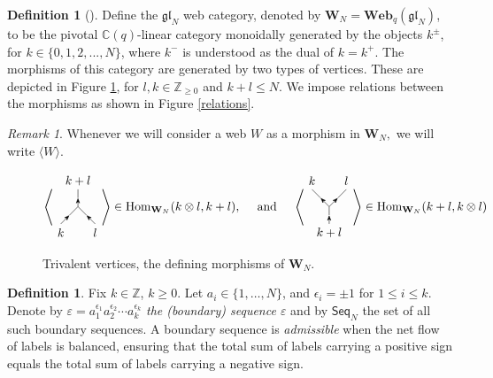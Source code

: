 \documentclass[12pt]{amsart}
\theoremstyle{definition}
\newtheorem{definition}[theorem]{Definition}
\theoremstyle{remark}
\newtheorem{remark}[theorem]{Remark}
\numberwithin{equation}{section}
\numberwithin{figure}{section}
\newcommand{\GL}{\mathfrak{gl}}
\newcommand{\Z}{\mathbb{Z}}
\newcommand{\webcat}{\mathbf{Web}}
\newcommand{\Web}{\mathbf{W}_N}
\newcommand{\Hom}{\mathrm{Hom}}
\newcommand{\Seq}{\mathsf{Seq}}
\begin{document}
\begin{definition} [{\cite[Section 2.2]{CKM2014}}] \label{TypeAWebs}
 Define the $\GL_N$ web category, denoted by 
 $\Web=\webcat_q(\GL_{N})$, to be the pivotal $\mathbb{C}(q)$-linear category monoidally generated by the objects $k^{\pm}$, for $k \in \{0,1,2,...,N\}$,
 where $k^-$ is understood as the dual of $k=k^{+}$. The morphisms of this category are generated by two types of vertices. These are depicted in Figure \ref{fig:Y}, for $l,k \in \mathbb{Z}_{\ge 0}$ and $k+l \leq N$. We impose relations between the morphisms as shown in Figure \ref{relations}.
 \end{definition}

\begin{remark}\label{rmk:web with langle in web category}
    Whenever we will consider a web $W$ as a morphism in $\Web,$ we will write $\langle W \rangle$.
\end{remark}
 
\begin{figure}[htbp]
  \centering
  \begin{equation*}
    \left\langle\begin{tikzpicture}[scale=0.5, baseline=-3]
      \draw[-Stealth] (0,0)--(0,0.5);
      \draw (0,0.5)--(0,1);
      \draw[-Stealth] (-1,-1)--(-0.5,-0.5);
      \draw (-0.5,-0.5)--(0,0);
      \draw[-Stealth] (1,-1)--(0.5,-0.5);
      \draw (0.5,-0.5)--(0,0);
      \node at (0,1.5) {$k+l$};
      \node at (-1,-1.5) {$k$};
      \node at (1,-1.5) {$l$};
    \end{tikzpicture} \right\rangle \in {\Hom}_{\Web}(k\otimes l, k+l),
    \quad \text{ and } \quad
    \left\langle\begin{tikzpicture}[scale=0.5, baseline=-3]
      \draw[-Stealth] (0,-1)--(0,-0.5);
      \draw (0,-0.5)--(0,0);
      \draw[-Stealth] (0,0)--(0.5,0.5);
      \draw (0.5,0.5)--(1,1);
      \draw[-Stealth] (0,0)--(-0.5,0.5);
      \draw (-0.5,0.5)--(-1,1);
      \node at (0,-1.5) {$k+l$};
      \node at (-1,1.5) {$k$};
      \node at (1,1.5) {$l$};
    \end{tikzpicture} \right\rangle \in {\Hom}_{\Web}(k+l, k \otimes l)
  \end{equation*}
  \caption{Trivalent vertices, the defining morphisms of $\Web$.}
  \label{fig:Y}
\end{figure}

\begin{definition}
    Fix $ k \in \Z$, $k\geq 0$. Let $a_i \in \{1, \ldots, N\}$, and $\epsilon_i = \pm 1$ for $1\leq i \leq k$. Denote by $\varepsilon = a_1^{\epsilon_1}a_2^{\epsilon_2}\cdots a_k^{\epsilon_k}$ \emph{the (boundary) sequence $\varepsilon$} and by $\Seq_{N}$ the set of all such boundary sequences. A boundary sequence is \emph{admissible} when the net flow of labels is balanced, ensuring that the total sum of labels carrying a positive sign equals the total sum of labels carrying a negative sign.
\end{definition}
\end{document}
